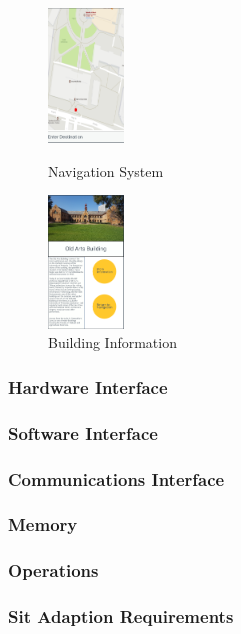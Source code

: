 \documentclass{article}
\begin{document}
\begin{figure}[h]
\centering
\begin{minipage}{.5\textwidth}
	\centering
	\includegraphics[width=2cm, height 8cm]{Navigation}
	\caption{Navigation System}
\end{minipage}%
\begin{minipage}{.5\textwidth}
	\centering
	\includegraphics[width=2cm, height 8cm]{BuildingInfo}
	\caption{Building Information}
\end{minipage}%
\end{figure}


            \subsubsection{Hardware Interface}
            \subsubsection{Software Interface}
            \subsubsection{Communications Interface}
            \subsubsection{Memory}
            \subsubsection{Operations}
            \subsubsection{Sit Adaption Requirements}
        
\end{document}
